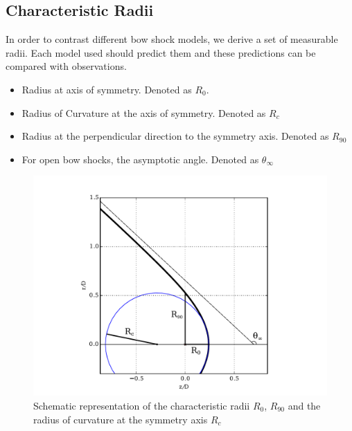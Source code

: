 \subsection{Characteristic Radii}

In order to contrast different bow shock models, we  derive a set of measurable radii. Each model used should predict them and these predictions can be
compared with observations.

\begin{itemize}
\item Radius at axis of symmetry. Denoted as $R_0$. 
\item Radius of Curvature at the axis of symmetry. Denoted as $R_c$
\item Radius at the  perpendicular direction to the symmetry axis. Denoted as $R_{90}$
\item For open bow shocks, the asymptotic angle. Denoted as $\theta_\infty$
\end{itemize} 

\begin{figure}
\includegraphics[width=\linewidth]{ch-radii_ed2}
\caption{Schematic representation of the characteristic radii $R_0$, $R_{90}$ and the radius of curvature at the symmetry axis $R_c$}
\end{figure}



